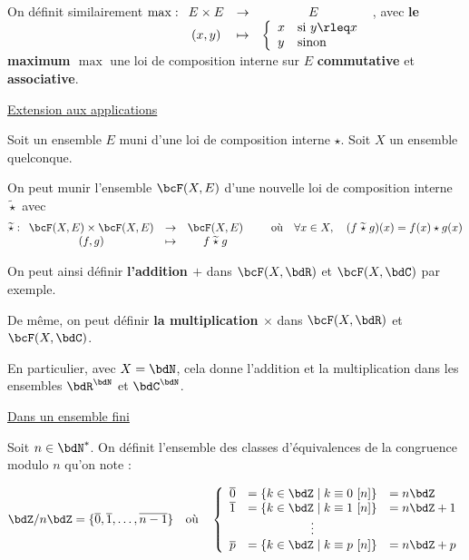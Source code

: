 \documentclass[a4paper,french,bookmarks]{article}
\begin{document}
\begin{enumerate}
\begin{enumerate}
        \itstar On définit similairement $\max : \begin{array}[t]{cccc}
        E\times E &\to& E  \\
        (x, y) &\mapsto& \left\lbrace\begin{array}{ll}
            x & \text{si} \ y \rleq x   \\
            y & \text{sinon}
        \end{array}\right.
    \end{array}$, avec \textbf{le maximum $\max$} une loi de composition interne sur $E$ \textbf{commutative} et \textbf{associative}.
    
    \end{enumerate}
    
    \ithand \underline{Extension aux applications}
    
    Soit un ensemble $E$ muni d'une loi de composition interne $\star$. Soit $X$ un ensemble quelconque.
    
    \begin{enumerate}
    
        \itstar On peut munir l'ensemble $\bcF(X, E)$ d'une nouvelle loi de composition interne $\widetilde\star$ avec \[\widetilde\star : \begin{array}[t]{ccc}
            \bcF(X, E) \times\bcF(X, E) &\to& \bcF(X, E) \\
            (f,g) &\mapsto& f\; \widetilde\star\; g
        \end{array} \qquad \text{où} \quad \forall x \in X, \quad (f\; \widetilde\star\; g)(x) = f(x) \star g(x)\]
        
        \itstar On peut ainsi définir \textbf{l'addition $+$} dans $\bcF(X, \bdR)$ et $\bcF(X, \bdC)$ par exemple.
        
        \itstar De même, on peut définir \textbf{la multiplication $\times$} dans $\bcF(X, \bdR)$ et $\bcF(X, \bdC)$.
        
        \itstar En particulier, avec $X = \bdN$, cela donne l'addition et la multiplication dans les ensembles $\bdR^\bdN$ et $\bdC^\bdN$.
        
    \end{enumerate}
    
    \ithand \underline{Dans un ensemble fini}
    
    Soit $n \in \bdN^*$. On définit l'ensemble des classes d'équivalences de la congruence modulo $n$ qu'on note :
    
    \[ \bdZ/n\bdZ = \{\overline{0}, \overline{1}, \dots, \overline{n-1}\} \quad \text{où} \quad \left\lbrace\begin{array}{ccl}
        \overline{0} &= \{k \in \bdZ \mid k \equiv 0 \ [n]\}&=n\bdZ  \\
        \overline{1} &= \{k \in \bdZ \mid k \equiv 1 \ [n]\} &= n\bdZ + 1\\
        &\vdots\\
        \overline{p} &= \{k \in \bdZ \mid k \equiv p \ [n]\} &= n\bdZ + p
    \end{array}\right.\]
    

\end{enumerate}
\end{document}
